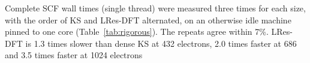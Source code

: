 Complete SCF wall times (single thread) were measured three times for each size, with the order of KS and LRes-DFT alternated, on an otherwise idle machine pinned to one core (Table~\ref{tab:rigorous}). The repeats agree within 7\%. LRes-DFT is 1.3 times slower than dense KS at 432 electrons, 2.0 times faster at 686 and 3.5 times faster at 1024 electrons